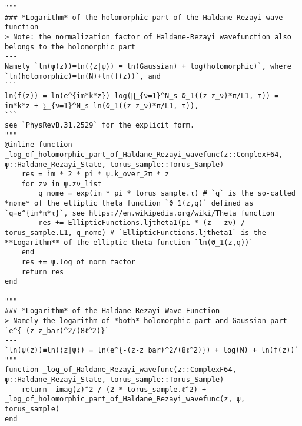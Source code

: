 \begin{verbatim}
"""
### *Logarithm* of the holomorphic part of the Haldane-Rezayi wave function 
> Note: the normalization factor of Haldane-Rezayi wavefunction also belongs to the holomorphic part
---
Namely `ln(ψ(z))≡ln(⟨z|ψ⟩) ≡ ln(Gaussian) + log(holomorphic)`, where `ln(holomorphic)≡ln(N)+ln(f(z))`, and 
```
ln(f(z)) = ln(e^{im*k*z}) log(∏_{ν=1}^N_s ϑ_1((z-z_ν)*π/L1, τ)) = im*k*z + ∑_{ν=1}^N_s ln(ϑ_1((z-z_ν)*π/L1, τ)),
```
see `PhysRevB.31.2529` for the explicit form.
"""
@inline function _log_of_holomorphic_part_of_Haldane_Rezayi_wavefunc(z::ComplexF64, ψ::Haldane_Rezayi_State, torus_sample::Torus_Sample)
    res = im * 2 * pi * ψ.k_over_2π * z
    for zν in ψ.zν_list
        q_nome = exp(im * pi * torus_sample.τ) # `q` is the so-called *nome* of the elliptic theta function `ϑ_1(z,q)` defined as `q=e^{im*π*τ}`, see https://en.wikipedia.org/wiki/Theta_function
        res += EllipticFunctions.ljtheta1(pi * (z - zν) / torus_sample.L1, q_nome) # `EllipticFunctions.ljtheta1` is the **Logarithm** of the elliptic theta function `ln(ϑ_1(z,q))`
    end
    res += ψ.log_of_norm_factor
    return res
end

"""
### *Logarithm* of the Haldane-Rezayi Wave Function
> Namely the logarithm of *both* holomorphic part and Gaussian part `e^{-(z-z_bar)^2/(8ℓ^2)}`
---
`ln(ψ(z))≡ln(⟨z|ψ⟩) = ln(e^{-(z-z_bar)^2/(8ℓ^2)}) + log(N) + ln(f(z))`
"""
function _log_of_Haldane_Rezayi_wavefunc(z::ComplexF64, ψ::Haldane_Rezayi_State, torus_sample::Torus_Sample)
    return -imag(z)^2 / (2 * torus_sample.ℓ^2) + _log_of_holomorphic_part_of_Haldane_Rezayi_wavefunc(z, ψ, torus_sample)
end
\end{verbatim}